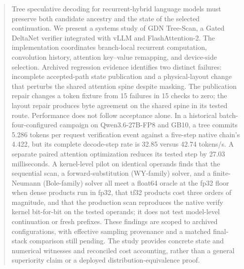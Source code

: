 \begin{abstract}
Tree speculative decoding for recurrent-hybrid language models must preserve both candidate ancestry and the state of the selected continuation. We present a systems study of GDN Tree-Scan, a Gated DeltaNet verifier integrated with vLLM and FlashAttention-2. The implementation coordinates branch-local recurrent computation, convolution history, attention key--value remapping, and device-side selection. Archived regression evidence identifies two distinct failures: incomplete accepted-path state publication and a physical-layout change that perturbs the shared attention spine despite masking. The publication repair changes a token fixture from 15 failures in 15 checks to zero; the layout repair produces byte agreement on the shared spine in its tested route. Performance does not follow acceptance alone. In a historical batch-four-configured campaign on Qwen3.6-27B-FP8 and GB10, a tree commits 5.286 tokens per request verification event against a five-step native chain's 4.422, but its complete decode-step rate is 32.85 versus 42.74 tokens/s. A separate paired attention optimization reduces its tested step by 27.03 milliseconds. A kernel-level pilot on identical operands finds that the sequential scan, a forward-substitution (WY-family) solver, and a finite-Neumann (Bole-family) solver all meet a float64 oracle at the fp32 floor when dense products run in fp32, that tf32 products cost three orders of magnitude, and that the production scan reproduces the native verify kernel bit-for-bit on the tested operands; it does not test model-level continuation or fresh prefixes. These findings are scoped to archived configurations, with effective sampling provenance and a matched final-stack comparison still pending. The study provides concrete state and numerical witnesses and reconciled cost accounting, rather than a general superiority claim or a deployed distribution-equivalence proof.
\end{abstract}
